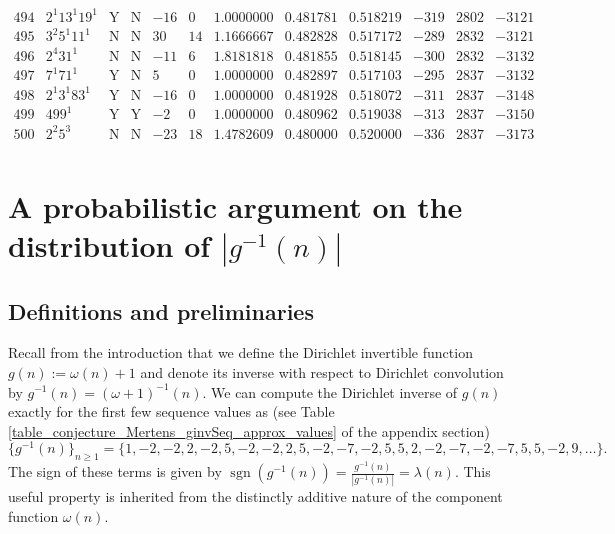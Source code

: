 \documentclass[11pt,reqno,a4letter]{article}
\numberwithin{figure}{section}
\numberwithin{table}{section}
\theoremstyle{plain}
\numberwithin{theorem}{section}
\theoremstyle{definition}
\newcommand{\NBRef}[1]{}
\begin{document}
\begin{table}[h!]
\begin{equation*}
{\begin{array}{cc|cc|ccc|cc|ccc}
 494 & 2^1 13^1 19^1 & \text{Y} & \text{N} & -16 & 0 & 1.0000000 & 0.481781 & 0.518219 & -319 & 2802 & -3121 \\
 495 & 3^2 5^1 11^1 & \text{N} & \text{N} & 30 & 14 & 1.1666667 & 0.482828 & 0.517172 & -289 & 2832 & -3121 \\
 496 & 2^4 31^1 & \text{N} & \text{N} & -11 & 6 & 1.8181818 & 0.481855 & 0.518145 & -300 & 2832 & -3132 \\
 497 & 7^1 71^1 & \text{Y} & \text{N} & 5 & 0 & 1.0000000 & 0.482897 & 0.517103 & -295 & 2837 & -3132 \\
 498 & 2^1 3^1 83^1 & \text{Y} & \text{N} & -16 & 0 & 1.0000000 & 0.481928 & 0.518072 & -311 & 2837 & -3148 \\
 499 & 499^1 & \text{Y} & \text{Y} & -2 & 0 & 1.0000000 & 0.480962 & 0.519038 & -313 & 2837 & -3150 \\
 500 & 2^2 5^3 & \text{N} & \text{N} & -23 & 18 & 1.4782609 & 0.480000 & 0.520000 & -336 & 2837 & -3173 \\  
\end{array}
}
\end{equation*}

\end{table} 


\newpage
\setcounter{section}{0}
\renewcommand{\thesection}{Appendix \Alph{section}}
\renewcommand{\thesubsection}{\Alph{section}.\arabic{subsection}} 


\newpage
\clearpage
\section{A probabilistic argument on the distribution of $|g^{-1}(n)|$} 

\subsection{Definitions and preliminaries} 

Recall from the introduction that we define the Dirichlet invertible function $g(n) := \omega(n) + 1$ and denote its 
inverse with respect to Dirichlet convolution by $g^{-1}(n) = (\omega+1)^{-1}(n)$. 
We can compute the
Dirichlet inverse of $g(n)$ exactly for the first few sequence values as 
(see Table \ref{table_conjecture_Mertens_ginvSeq_approx_values} of the appendix section) 
\[
\{g^{-1}(n)\}_{n \geq 1} = \{1, -2, -2, 2, -2, 5, -2, -2, 2, 5, -2, -7, -2, 5, 5, 2, -2, -7, -2, 
     -7, 5, 5, -2, 9, \ldots \}. 
\] 
The sign of these terms is given by 
$\operatorname{sgn}(g^{-1}(n)) = \frac{g^{-1}(n)}{|g^{-1}(n)|} = \lambda(n)$. 
This useful property is inherited from the distinctly 
additive nature of the component function $\omega(n)$. 
\end{document}
